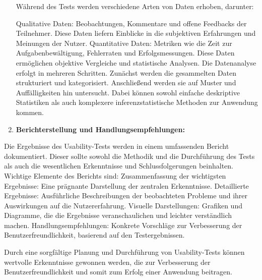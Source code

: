 \begin{enumerate}
Während des Tests werden verschiedene Arten von Daten erhoben, darunter:

Qualitative Daten: Beobachtungen, Kommentare und offene Feedbacks der Teilnehmer. Diese Daten liefern Einblicke in die subjektiven Erfahrungen und Meinungen der Nutzer.
Quantitative Daten: Metriken wie die Zeit zur Aufgabenbewältigung, Fehlerraten und Erfolgsmessungen. Diese Daten ermöglichen objektive Vergleiche und statistische Analysen.
Die Datenanalyse erfolgt in mehreren Schritten. Zunächst werden die gesammelten Daten strukturiert und kategorisiert. Anschließend werden sie auf Muster und Auffälligkeiten hin untersucht. Dabei können sowohl einfache deskriptive Statistiken als auch komplexere inferenzstatistische Methoden zur Anwendung kommen.


    \item \textbf{Berichterstellung und Handlungsempfehlungen:}
\end{enumerate}
Die Ergebnisse des Usability-Tests werden in einem umfassenden Bericht dokumentiert. Dieser sollte sowohl die Methodik und die Durchführung des Tests als auch die wesentlichen Erkenntnisse und Schlussfolgerungen beinhalten. Wichtige Elemente des Berichts sind:
Zusammenfassung der wichtigsten Ergebnisse: Eine prägnante Darstellung der zentralen Erkenntnisse.
Detaillierte Ergebnisse: Ausführliche Beschreibungen der beobachteten Probleme und ihrer Auswirkungen auf die Nutzererfahrung.
Visuelle Darstellungen: Grafiken und Diagramme, die die Ergebnisse veranschaulichen und leichter verständlich machen.
Handlungsempfehlungen: Konkrete Vorschläge zur Verbesserung der Benutzerfreundlichkeit, basierend auf den Testergebnissen.

Durch eine sorgfältige Planung und Durchführung von Usability-Tests können wertvolle Erkenntnisse gewonnen werden, die zur Verbesserung der Benutzerfreundlichkeit und somit zum Erfolg einer Anwendung beitragen.
